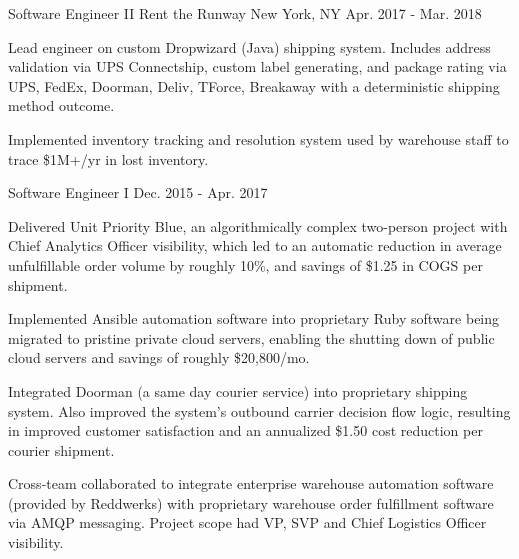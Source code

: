 
\begin{cventries}


  \cventry
    {Software Engineer II} %
    {Rent the Runway} %
    {New York, NY} %
    {Apr. 2017 - Mar. 2018} %
    {
      \begin{cvitems} %
        \item {Lead engineer on custom Dropwizard (Java) shipping system. Includes address validation via UPS Connectship, custom label generating, and package rating via UPS, FedEx, Doorman, Deliv, TForce, Breakaway with a deterministic shipping method outcome.}
        \item {Implemented inventory tracking and resolution system used by warehouse staff to trace \$1M+/yr in lost inventory.}
      \end{cvitems}
    }

  \cventry
    {Software Engineer I} %
    {} %
    {} %
    {Dec. 2015 - Apr. 2017} %
    {
      \begin{cvitems} %
        \item {Delivered Unit Priority Blue, an algorithmically complex two-person project with Chief Analytics Officer visibility, which led to an automatic reduction in average unfulfillable order volume by roughly 10\%, and savings of \$1.25 in COGS per shipment.}
        \item {Implemented Ansible automation software into proprietary Ruby software being migrated to pristine private cloud servers, enabling the shutting down of public cloud servers and savings of roughly \$20,800/mo.}
        \item {Integrated Doorman (a same day courier service) into proprietary shipping system. Also improved the system's outbound carrier decision flow logic, resulting in improved customer satisfaction and an annualized \$1.50 cost reduction per courier shipment.}
        \item {Cross-team collaborated to integrate enterprise warehouse automation software (provided by Reddwerks) with proprietary warehouse order fulfillment software via AMQP messaging. Project scope had VP, SVP and Chief Logistics Officer visibility.}
      \end{cvitems}
    }


\end{cventries}
